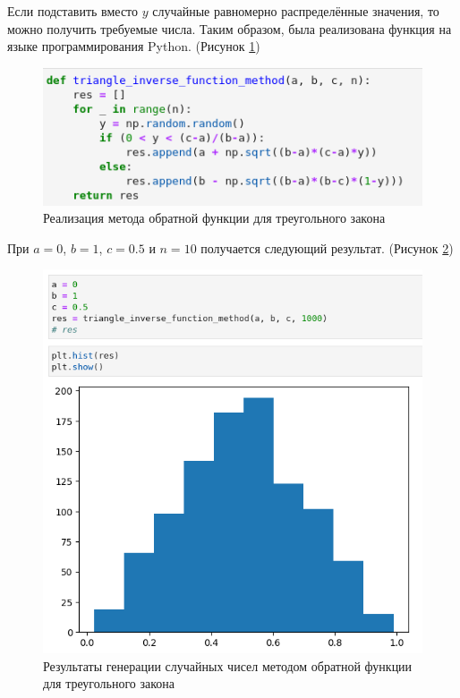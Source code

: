 \documentclass[14pt,fleqn]{extarticle}
\begin{document}
	Если подставить вместо $y$ случайные равномерно распределённые значения, то можно получить требуемые числа.
	\newpage
	Таким образом, была реализована функция на языке программирования Python. (Рисунок \ref{fig:triangle_inverse_function_method_code})
	\begin{figure}[h]
		\centering \includegraphics[scale=0.7]{code4}
		\caption{Реализация метода обратной функции для треугольного закона}
		\label{fig:triangle_inverse_function_method_code}
	\end{figure}

	При $a = 0$, $b = 1$, $c = 0.5$ и $n = 10$ получается следующий результат. (Рисунок \ref{fig:triangle_inverse_function_method_resul1})
	\begin{figure}[h]
		\centering \includegraphics[scale=0.5]{result41}
		\caption{Результаты генерации случайных чисел методом обратной функции для треугольного закона}
		\label{fig:triangle_inverse_function_method_resul1}
	\end{figure}
	
\end{document}
